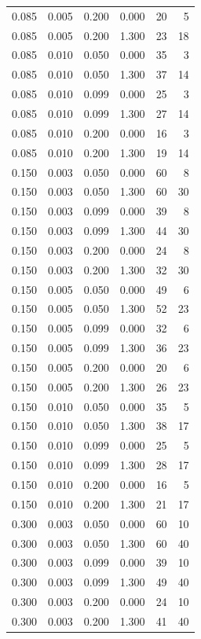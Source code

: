 \begin{table}
\begin{tabular}{rrrrrr}
0.085 & 0.005 & 0.200 & 0.000 & 20 & 5 \\
0.085 & 0.005 & 0.200 & 1.300 & 23 & 18 \\
0.085 & 0.010 & 0.050 & 0.000 & 35 & 3 \\
0.085 & 0.010 & 0.050 & 1.300 & 37 & 14 \\
0.085 & 0.010 & 0.099 & 0.000 & 25 & 3 \\
0.085 & 0.010 & 0.099 & 1.300 & 27 & 14 \\
0.085 & 0.010 & 0.200 & 0.000 & 16 & 3 \\
0.085 & 0.010 & 0.200 & 1.300 & 19 & 14 \\
0.150 & 0.003 & 0.050 & 0.000 & 60 & 8 \\
0.150 & 0.003 & 0.050 & 1.300 & 60 & 30 \\
0.150 & 0.003 & 0.099 & 0.000 & 39 & 8 \\
0.150 & 0.003 & 0.099 & 1.300 & 44 & 30 \\
0.150 & 0.003 & 0.200 & 0.000 & 24 & 8 \\
0.150 & 0.003 & 0.200 & 1.300 & 32 & 30 \\
0.150 & 0.005 & 0.050 & 0.000 & 49 & 6 \\
0.150 & 0.005 & 0.050 & 1.300 & 52 & 23 \\
0.150 & 0.005 & 0.099 & 0.000 & 32 & 6 \\
0.150 & 0.005 & 0.099 & 1.300 & 36 & 23 \\
0.150 & 0.005 & 0.200 & 0.000 & 20 & 6 \\
0.150 & 0.005 & 0.200 & 1.300 & 26 & 23 \\
0.150 & 0.010 & 0.050 & 0.000 & 35 & 5 \\
0.150 & 0.010 & 0.050 & 1.300 & 38 & 17 \\
0.150 & 0.010 & 0.099 & 0.000 & 25 & 5 \\
0.150 & 0.010 & 0.099 & 1.300 & 28 & 17 \\
0.150 & 0.010 & 0.200 & 0.000 & 16 & 5 \\
0.150 & 0.010 & 0.200 & 1.300 & 21 & 17 \\
0.300 & 0.003 & 0.050 & 0.000 & 60 & 10 \\
0.300 & 0.003 & 0.050 & 1.300 & 60 & 40 \\
0.300 & 0.003 & 0.099 & 0.000 & 39 & 10 \\
0.300 & 0.003 & 0.099 & 1.300 & 49 & 40 \\
0.300 & 0.003 & 0.200 & 0.000 & 24 & 10 \\
0.300 & 0.003 & 0.200 & 1.300 & 41 & 40 \\

\end{tabular}
\end{table}
